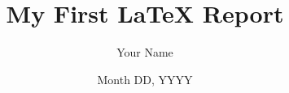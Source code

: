\documentclass[letter,english,12pt,svgnames,titlepage]{report}
\begin{document}
  \date{Month DD, YYYY}
  \title{My First LaTeX Report}
  \author{Your Name}
  \maketitle  %
  \clearpage  %
  \begin{adjustbox}{max totalsize={.9\textwidth}{.8\textheight},center}
    
  \end{adjustbox}
\end{document}
